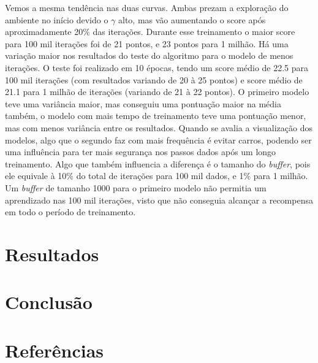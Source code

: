 \documentclass[letterpaper]{article} %
\begin{document}
Vemos a mesma tendência nas duas curvas. Ambas prezam a exploração do ambiente no início devido o $\gamma$ alto, mas vão aumentando o score após aproximadamente 20\% das iterações. Durante esse treinamento o maior score para 100 mil iterações foi de 21 pontos, e 23 pontos para 1 milhão. Há uma variação maior nos resultados do teste do algoritmo para o modelo de menos iterações. O teste foi realizado em 10 épocas, tendo um score médio de 22.5 para 100 mil iterações (com resultados variando de 20 à 25 pontos) e score médio de 21.1 para 1 milhão de iterações (variando de 21 à 22 pontos). O primeiro modelo teve uma variância maior, mas conseguiu uma pontuação maior na média também, o modelo com mais tempo de treinamento teve uma pontuação menor, mas com menos variância entre os resultados. Quando se avalia a visualização dos modelos, algo que o segundo faz com mais frequência é evitar carros, podendo ser uma influência para ter mais segurança nos passos dados após um longo treinamento. Algo que também influencia a diferença é o tamanho do \textit{buffer}, pois ele equivale à 10\% do total de iterações para 100 mil dados, e 1\% para 1 milhão. Um \textit{buffer} de tamanho 1000 para o primeiro modelo não permitia um aprendizado nas 100 mil iterações, visto que não conseguia alcançar a recompensa em todo o período de treinamento.

\section{Resultados}



\section{Conclusão}

\section{Referências}
\end{document}
